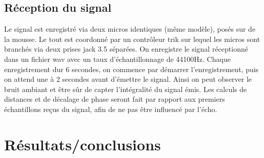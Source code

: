 \documentclass[12pt,a4paper]{report}
\begin{document}
\subsection{Réception du signal}
Le signal est enregistré via deux micros identiques (même modèle), posés sur de la mousse. Le tout est coordonné par un contrôleur trik sur lequel les micros sont branchés via deux prises jack 3.5 séparées.
On enregistre le signal réceptionné dans un fichier wav avec un taux d'échantillonnage de 44100Hz.
Chaque enregistrement dur 6 secondes, on commence par démarrer l'enregistrement, puis on attend une à 2 secondes avant d'émettre le signal. Ainsi on peut observer le bruit ambiant et être sûr de capter l'intégralité du signal émis.
Les calculs de distances et de décalage de phase seront fait par rapport aux premiers échantillons reçus du signal, afin de ne pas être influencé par l'écho.

\section{Résultats/conclusions}
\end{document}
